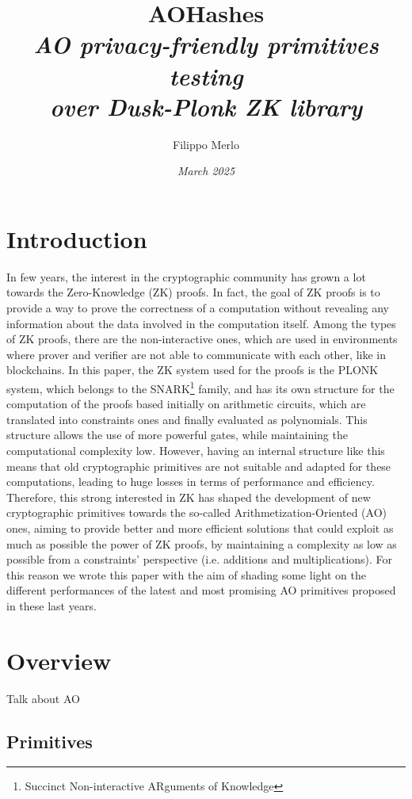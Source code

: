 \documentclass[12pt, a4paper]{report}
\title{{\textbf{AOHashes}}\\[20pt]\textsl{AO privacy-friendly primitives testing\\over Dusk-Plonk ZK library}}
\author{\Large{Filippo Merlo}}
\date{\textit{March 2025}}
\begin{document}
\maketitle
\newpage
{}
\tableofcontents
\pagebreak

\chapter{Introduction}\label{chap:intro}

In few years, the interest in the cryptographic community has grown a lot towards the Zero-Knowledge (ZK) proofs. In fact, the goal of ZK proofs is to provide a way to prove the correctness of a computation without revealing any information about the data involved in the computation itself. Among the types of ZK proofs, there are the non-interactive ones, which are used in environments where prover and verifier are not able to communicate with each other, like in blockchains. In this paper, the ZK system used for the proofs is the PLONK system, which belongs to the SNARK\footnote{Succinct Non-interactive ARguments of Knowledge} family, and has its own structure for the computation of the proofs based initially on arithmetic circuits, which are translated into constraints ones and finally evaluated as polynomials. This structure allows the use of more powerful gates, while maintaining the computational complexity low.
However, having an internal structure like this means that old cryptographic primitives are not suitable and adapted for these computations, leading to huge losses in terms of performance and efficiency. Therefore, this strong interested in ZK has shaped the development of new cryptographic primitives towards the so-called Arithmetization-Oriented (AO) ones, aiming to provide better and more efficient solutions that could exploit as much as possible the power of ZK proofs, by maintaining a complexity as low as possible from a constraints' perspective (i.e. additions and multiplications). For this reason we wrote this paper with the aim of shading some light on the different performances of the latest and most promising AO primitives proposed in these last years.

\chapter{Overview}\label{chap:overview}

Talk about AO


\section{Primitives}\label{sec:primitives}
\end{document}
